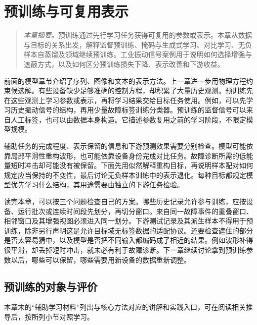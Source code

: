 \chapter{预训练与可复用表示}
\label{chap:pretraining}
\begin{quote}\small
\textit{本章摘要。}预训练通过先行学习任务获得可复用的参数或表示。本章从数据与目标的关系出发，解释监督预训练、掩码与生成式学习、对比学习、无负样本自蒸馏及领域继续预训练。工业振动信号案例用于说明如何选择增强与遮蔽方式，以及如何区分预训练损失下降、表示改善和下游收益。
\end{quote}

前面的模型章节介绍了序列、图像和文本的表示方法。上一章进一步用物理方程约束候选解。有些设备缺少足够准确的控制方程，却积累了大量历史观测。预训练先在这些观测上学习参数或表示，再将学习结果交给目标任务使用。例如，可以先学习历史振动信号的结构，再用少量故障标签训练分类器。预训练的监督信号可以来自人工标签，也可以由数据本身构造。它描述参数复用之前的学习阶段，不限定模型规模。

辅助任务的完成程度、表示保留的信息和下游预测效果需要分别检查。模型可能依靠局部平滑性重构波形，也可能依靠设备身份完成对比任务。故障诊断所需的低能量短时冲击却可能没有被保留。下面先用似然解释重构目标，再说明样本配对如何规定应当保持的不变性，最后讨论无负样本训练中的表示退化。每种目标都规定模型优先学习什么结构，其用途需要由独立的下游任务检验。

读完本章，可以按三个问题检查自己的方案。哪些历史记录允许参与训练，应按设备、运行批次或连续时间段先划分，再切分窗口。来自同一故障事件的重叠窗口、相邻窗口及其增强视图必须进入同一划分。下游测试记录及其派生样本不得用于预训练，除非另行声明这是允许目标域无标签数据的适配协议。还要检查遮住的部分是否太容易猜中，以及模型是否把不同输入都编码成了相近的结果。例如波形补得很平滑，却丢掉短时冲击，就未必有利于故障诊断。下一章继续讨论拿到预训练参数以后，哪些可以保留，哪些需要用新设备的数据重新调整。

\section{预训练的对象与评价}

本章末的“辅助学习材料”列出与核心方法对应的讲解和实践入口，可在阅读相关推导后，按所列小节对照学习。

